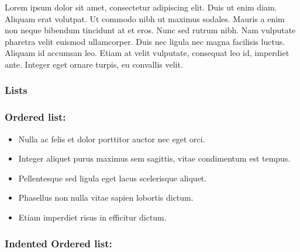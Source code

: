 \documentclass{article}
\begin{document}
Lorem ipsum dolor sit amet, consectetur adipiscing elit. Duis ut enim diam. Aliquam erat volutpat. Ut commodo nibh ut maximus sodales. Mauris a enim non neque bibendum tincidunt at et eros. Nunc sed rutrum nibh. Nam vulputate pharetra velit euismod ullamcorper. Duis nec ligula nec magna facilisis luctus. Aliquam id accumsan leo. Etiam at velit vulputate, consequat leo id, imperdiet ante. Integer eget ornare turpis, eu convallis velit.


\subsubsection{Lists}\label{H2736763}



\subsubsection{Ordered list:}\label{H1860783}


\begin{itemize}
\item Nulla ac felis et dolor porttitor auctor nec eget orci.


\item Integer aliquet purus maximus sem sagittis, vitae condimentum est tempus.


\item Pellentesque sed ligula eget lacus scelerisque aliquet.


\item Phasellus non nulla vitae sapien lobortis dictum.


\item Etiam imperdiet risus in efficitur dictum.


\end{itemize}

\subsubsection{Indented Ordered list:}\label{H3077438}
\end{document}
